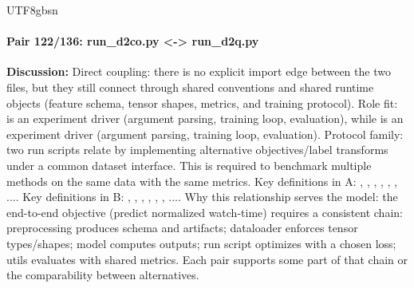 \documentclass[11pt]{article}
\begin{document}
\begin{CJK*}{UTF8}{gbsn}
\paragraph{Pair 122/136: run\_d2co.py <-> run\_d2q.py}
\textbf{Discussion:} Direct coupling: there is no explicit import edge between the two files, but they still connect through shared conventions and shared runtime objects (feature schema, tensor shapes, metrics, and training protocol). Role fit: \texttt{} is an experiment driver (argument parsing, training loop, evaluation), while \texttt{} is an experiment driver (argument parsing, training loop, evaluation). Protocol family: two run scripts relate by implementing alternative objectives/label transforms under a common dataset interface. This is required to benchmark multiple methods on the same data with the same metrics. Key definitions in A: \texttt{}, \texttt{}, \texttt{}, \texttt{}, \texttt{}, \texttt{}, .... Key definitions in B: \texttt{}, \texttt{}, \texttt{}, \texttt{}, \texttt{}, \texttt{}, .... Why this relationship serves the model: the end-to-end objective (predict normalized watch-time) requires a consistent chain: preprocessing produces schema and artifacts; dataloader enforces tensor types/shapes; model computes outputs; run script optimizes with a chosen loss; utils evaluates with shared metrics. Each pair supports some part of that chain or the comparability between alternatives.


\end{CJK*}
\end{document}
